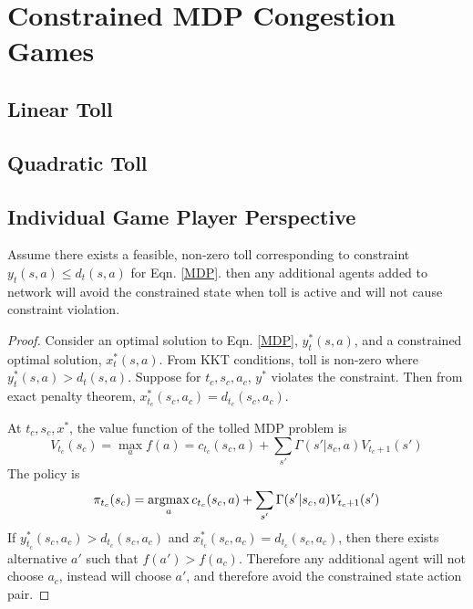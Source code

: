 \section{Constrained MDP Congestion Games}\label{convergence}
\subsection{Linear Toll}
\subsection{Quadratic Toll}
\subsection{Individual Game Player Perspective}
\begin{theorem}
Assume there exists a feasible, non-zero toll corresponding to constraint  $y_t(s,a) \leq d_t(s,a)$ for Eqn. \ref{MDP}. 
then any additional agents added to network will avoid the constrained state when toll is active and will not cause constraint violation. 
\end{theorem}
\begin{proof}
Consider an optimal solution to Eqn. \ref{MDP}, $y_t^*(s,a)$, and a constrained optimal solution, $x_t^*(s,a)$. From KKT conditions, toll is non-zero where $y_t^*(s,a) > d_t(s,a) $. Suppose for $t_c, s_c, a_c $, $y^* $ violates the constraint. Then from exact penalty theorem, $x_{t_c}^*(s_c,a_c) = d_{t_c}(s_c,a_c) $. 


At $t_c, s_c, x^* $, the value function of the tolled MDP problem is
\[
V_{t_c}(s_c)  = \max_a f(a) = c_{t_c}(s_c, a) + \sum_{s'}\Gamma (s' | s_c, a)V_{t_c + 1}(s')
\]
The policy is 
\[
\pi_{t_c}(s_c)  = \mathop{\rm argmax}_a c_{t_c}(s_c, a) + \sum_{s'}\Gamma (s' | s_c, a)V_{t_c + 1}(s')
\]
If $ y_{t_c}^*(s_c,a_c) > d_{t_c}(s_c,a_c) $ and $x_{t_c}^*(s_c,a_c) = d_{t_c}(s_c,a_c) $, then there exists alternative $a' $ such that $f(a') > f(a_c) $. Therefore any additional agent will not choose $a_c $, instead will choose $a' $, and therefore avoid the constrained state action pair. 
\end{proof}